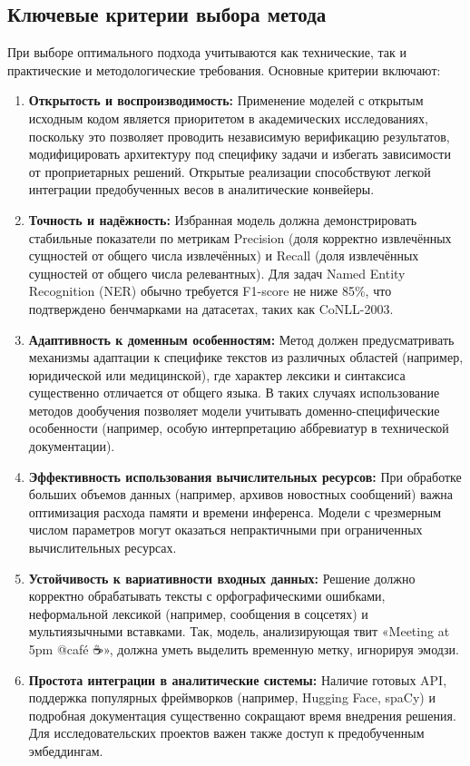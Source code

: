\subsection{Ключевые критерии выбора метода}

При выборе оптимального подхода учитываются как технические, так и практические и методологические требования. Основные критерии включают:

\begin{enumerate}
    \item \textbf{Открытость и воспроизводимость:}  
    Применение моделей с открытым исходным кодом является приоритетом в академических исследованиях, поскольку это позволяет проводить независимую верификацию результатов, модифицировать архитектуру под специфику задачи и избегать зависимости от проприетарных решений. Открытые реализации способствуют легкой интеграции предобученных весов в аналитические конвейеры.

    \item \textbf{Точность и надёжность:}  
    Избранная модель должна демонстрировать стабильные показатели по метрикам Precision (доля корректно извлечённых сущностей от общего числа извлечённых) и Recall (доля извлечённых сущностей от общего числа релевантных). Для задач Named Entity Recognition (NER) обычно требуется F1-score не ниже 85\%, что подтверждено бенчмарками на датасетах, таких как CoNLL-2003.

    \item \textbf{Адаптивность к доменным особенностям:}  
    Метод должен предусматривать механизмы адаптации к специфике текстов из различных областей (например, юридической или медицинской), где характер лексики и синтаксиса существенно отличается от общего языка. В таких случаях использование методов дообучения позволяет модели учитывать доменно-специфические особенности (например, особую интерпретацию аббревиатур в технической документации).

    \item \textbf{Эффективность использования вычислительных ресурсов:}  
    При обработке больших объемов данных (например, архивов новостных сообщений) важна оптимизация расхода памяти и времени инференса. Модели с чрезмерным числом параметров могут оказаться непрактичными при ограниченных вычислительных ресурсах.

    \item \textbf{Устойчивость к вариативности входных данных:}  
    Решение должно корректно обрабатывать тексты с орфографическими ошибками, неформальной лексикой (например, сообщения в соцсетях) и мультиязычными вставками. Так, модель, анализирующая твит «Meeting at 5pm @café ☕», должна уметь выделить временную метку, игнорируя эмодзи.

    \item \textbf{Простота интеграции в аналитические системы:}  
    Наличие готовых API, поддержка популярных фреймворков (например, Hugging Face, spaCy) и подробная документация существенно сокращают время внедрения решения. Для исследовательских проектов важен также доступ к предобученным эмбеддингам.
\end{enumerate}

